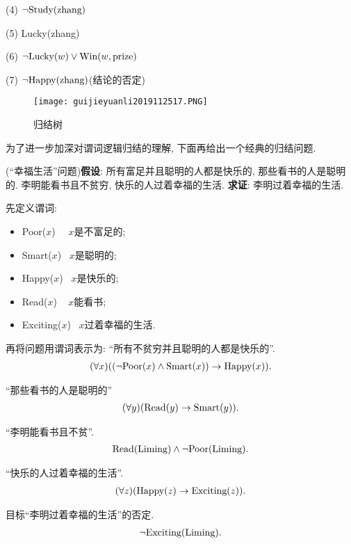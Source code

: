     (4) $\neg \textup{Study}(\textup{zhang})$

    (5) \textup{Lucky}(\textup{zhang})

    (6) $\neg \textup{Lucky}(w)\vee \textup{Win}(w, \textup{prize})$

    (7) $\neg \textup{Happy}(\textup{zhang})$(结论的否定)
\begin{figure}[H]
\centering
\texttt{[image: guijieyuanli2019112517.PNG]}
\caption{归结树}
\label{AI32fig17}
\end{figure}

为了进一步加深对谓词逻辑归结的理解, 下面再给出一个经典的归结问题.
\begin{example}
(“幸福生活”问题)\textbf{假设}: 所有富足并且聪明的人都是快乐的, 那些看书的人是聪明的. 李明能看书且不贫穷, 快乐的人过着幸福的生活.
\textbf{求证}: 李明过着幸福的生活.
\end{example}
\begin{result}
先定义谓词:
\begin{itemize}
    \item Poor($x$)     \quad\,\,\,\,  $x$是不富足的;
    \item Smart($x$)    \quad\,  $x$是聪明的;
    \item Happy($x$)    \, $x$是快乐的;
    \item Read($x$)     \,\,\, $x$能看书;
    \item Exciting($x$) \, $x$过着幸福的生活.
\end{itemize}

再将问题用谓词表示为: “所有不贫穷并且聪明的人都是快乐的”.
\begin{align}
    (\forall x)((\neg \textup{Poor}(x)\wedge \textup{Smart}(x))\rightarrow \textup{Happy}(x)).
\end{align}

“那些看书的人是聪明的”
\begin{align}
    (\forall y) (\textup{Read}(y) \rightarrow  \textup{Smart}(y)).
\end{align}

“李明能看书且不贫”.
\begin{align}
    \textup{Read}(\textup{Liming})\wedge \neg \textup{Poor}(\textup{Liming}).
\end{align}

“快乐的人过着幸福的生活”.
\begin{align}
    (\forall z) (\textup{Happy}(z)\rightarrow \textup{Exciting}(z)).
\end{align}

目标“李明过着幸福的生活”的否定.
\begin{align}
    \neg \textup{Exciting}(\textup{Liming}).
\end{align}
\end{result}

